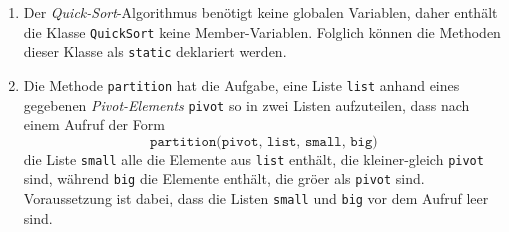 \begin{enumerate}
\item Der \emph{Quick-Sort}-Algorithmus ben\"otigt keine globalen Variablen,
      daher enth\"alt die Klasse \texttt{QuickSort} keine Member-Variablen.
      Folglich k\"onnen die Methoden dieser Klasse als \texttt{static}
      deklariert werden.
\item Die Methode \texttt{partition} hat die Aufgabe, eine Liste \texttt{list} anhand eines
      gegebenen \emph{Pivot-Elements} \texttt{pivot} so in zwei Listen aufzuteilen, dass nach einem
      Aufruf der Form 
      \[ \texttt{partition(pivot, list, small, big)} \]
      die Liste \texttt{small} alle die Elemente aus 
      \texttt{list} enth\"alt, die kleiner-gleich \texttt{pivot} sind, w\"ahrend \texttt{big}
      die Elemente enth\"alt, die gr\"o\3er als \texttt{pivot} sind.
      Voraussetzung ist dabei, dass die Listen \texttt{small} und \texttt{big} vor dem
      Aufruf leer sind.  


\end{enumerate}
